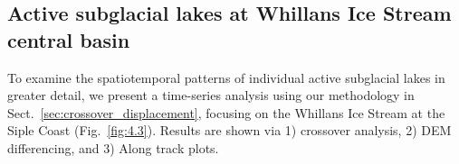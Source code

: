 
\subsection{Active subglacial lakes at Whillans Ice Stream central basin} \label{sec:whillanscentralbasin}

To examine the spatiotemporal patterns of individual active subglacial lakes in greater detail, we present a time-series analysis using our methodology in Sect.~\ref{sec:crossover_displacement}, focusing on the Whillans Ice Stream at the Siple Coast (Fig.~\ref{fig:4.3}).
Results are shown via 1) crossover analysis, 2) \gls{DEM} differencing, and 3) Along track plots.



